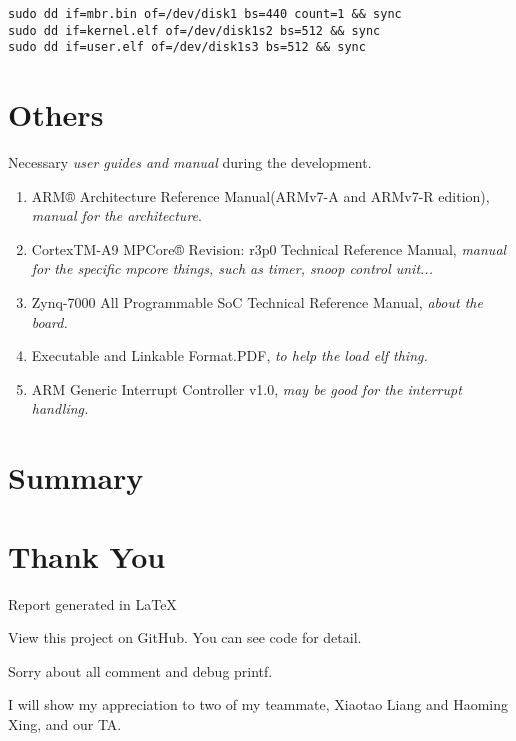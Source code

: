 \documentclass[12pt]{article}
\begin{document}
\begin{lstlisting}
sudo dd if=mbr.bin of=/dev/disk1 bs=440 count=1 && sync
sudo dd if=kernel.elf of=/dev/disk1s2 bs=512 && sync
sudo dd if=user.elf of=/dev/disk1s3 bs=512 && sync
\end{lstlisting}

\section{Others}

Necessary \emph{user guides and manual} during the development.

\begin{enumerate}
	\item	ARM® Architecture Reference Manual(ARMv7-A and ARMv7-R edition), \emph{manual for the architecture}.
	\item CortexTM-A9 MPCore® Revision: r3p0 Technical Reference Manual, \emph{manual for the specific mpcore things, such as timer, snoop control unit...}
	\item	Zynq-7000 All Programmable SoC Technical Reference Manual, \emph{about the board.}
	\item	Executable and Linkable Format.PDF, \emph{to help the load elf thing.}
	\item ARM Generic Interrupt Controller v1.0, \emph{may be good for the interrupt handling.}
\end{enumerate}

\section{Summary}


\section{Thank You}

\indent \indent Report generated in \LaTeX

View this project on GitHub. You can see code for detail.

Sorry about all comment and debug printf.

I will show my appreciation to two of my teammate, Xiaotao Liang and Haoming Xing, and our TA.
\end{document}
